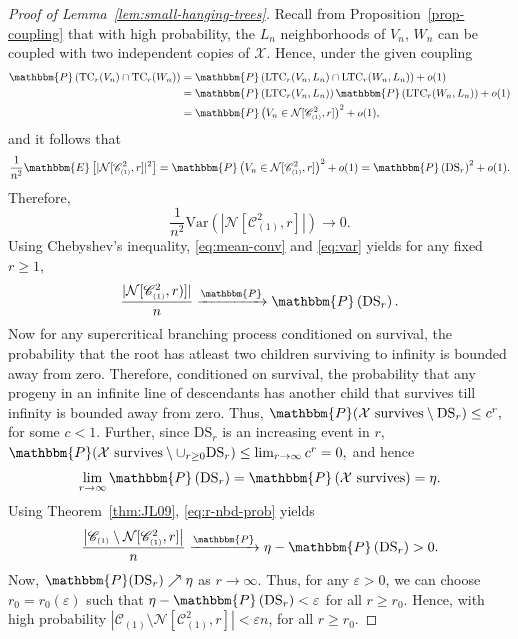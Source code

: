 \documentclass[11pt,a4paper, reqno]{article}
\numberwithin{equation}{section}
\numberwithin{equation}{section}
\def\sss{\scriptscriptstyle}
\newcommand{\prob}[1]{\ensuremath{\mathbbm{P}\left(#1\right)}}
\newcommand{\expt}[1]{\ensuremath{\mathbbm{E}\left[#1\right]}}
\newcommand{\var}[1]{\ensuremath{\mathrm{Var}\left(#1\right)}}
\newcommand{\pto}{\ensuremath{\xrightarrow{\mathbbm{P}}}}
\newcommand{\PR}{\ensuremath{\mathbbm{P}}}
\newcommand{\1}{\ensuremath{\mathbbm{1}}}
\newcommand{\C}{\mathscr{C}_{\sss (1)}}
\newcommand{\TC}{\mathrm{TC}}
\newcommand{\LTC}{\mathrm{LTC}}
\numberwithin{equation}{section}
\numberwithin{theorem}{section}
\begin{document}
\begin{proof}[Proof of Lemma~\ref{lem:small-hanging-trees}]
Recall from Proposition~\ref{prop-coupling} that with high probability, the $L_n$ neighborhoods of $V_n$, $W_n$ can be coupled with two independent copies of $\mathcal{X}$. 
Hence, under the given coupling
\begin{equation*}
\begin{split}
\prob{\TC_r(V_n)\cap \TC_r(W_n)}&=\prob{\LTC_r(V_n,L_n)\cap \LTC_r(W_n,L_n)}+o(1)\\
 & = \prob{\LTC_r(V_n,L_n)}\prob{\LTC_r(W_n,L_n)}+o(1)\\
 &=\prob{V_n\in\mathcal{N}[\C^2,r]}^2+o(1),
\end{split}
\end{equation*}
and it follows that
\begin{equation*}
\begin{split}
\frac{1}{n^2} \expt{|\mathcal{N}[\C^2,r]|^2} =\prob{V_n\in\mathcal{N}[\C^2,r]}^2+o(1)= \prob{\mathrm{DS}_r}^2+o(1).
  \end{split}
\end{equation*}
Therefore,
\begin{equation}\label{eq:var}
 \frac{1}{n^2}\var{|\mathcal{N}[\C^2,r]|}\to 0.
\end{equation}
Using Chebyshev's inequality, \eqref{eq:mean-conv} and \eqref{eq:var} yields for any fixed $r\geq 1$,
\begin{equation}\label{eq:r-nbd-prob}
 \frac{|\mathcal{N}[\C^2,r)]|}{n}\pto  \prob{\mathrm{DS}_r}.
\end{equation}
Now for any supercritical branching process conditioned on survival, the probability that the root has atleast two children surviving to infinity is bounded away from zero.
Therefore, conditioned on survival, the probability that any progeny in an infinite line of descendants has another child that survives till infinity is bounded away from zero. 
Thus, $\PR(\mathcal{X}\text{ survives}\setminus \mathrm{DS}_r)\leq c^r,$ for some $c<1$. 
Further, since $\mathrm{DS}_r$ is an increasing event in $r$, $\PR(\mathcal{X}\text{ survives}\setminus \cup_{r\geq 0}\mathrm{DS}_r)\leq\lim_{r\to\infty}c^r=0,$ and hence
\begin{equation}\label{eq:r-limit}
\lim_{r\to\infty}\prob{\mathrm{DS}_r} =\prob{\mathcal{X}\text{ survives}}=\eta.
\end{equation}
Using Theorem~\ref{thm:JL09}, \eqref{eq:r-nbd-prob} yields
\begin{equation}\label{eq:outside-r-nbd}
\begin{split}
\frac{\left|\mathscr{C}_{\sss (1)}\setminus\mathcal{N}[\mathscr{C}_{\sss (1)}^2,r]\right|}{n}\pto \eta - \prob{\mathrm{DS}_r}>0.
\end{split}
\end{equation}
Now, $\PR(\mathrm{DS}_r) \nearrow \eta$ as $r\to\infty$. Thus,
for any $\varepsilon>0$, we can choose $r_0 = r_0(\varepsilon)$ such that $\eta- \prob{\mathrm{DS}_r}<\varepsilon$ for all $r\geq r_0$. 
Hence, with high probability
$\left|\mathscr{C}_{\sss (1)}\setminus\mathcal{N}[\mathscr{C}_{\sss (1)}^2,r]\right|<\varepsilon n$, for all $r\geq r_0$.
\end{proof}
\end{document}
